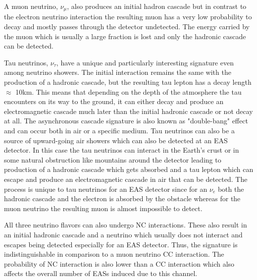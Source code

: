 A muon neutrino, $\nu_{\mu}$, also produces an initial hadron cascade but in contrast to the electron neutrino interaction the resulting muon has a very low probability to decay and mostly passes through the detector undetected. The energy carried by the muon which is usually a large fraction is lost and only the hadronic cascade can be detected.

Tau neutrinos, $\nu_{\tau}$, have a unique and particularly interesting signature even among neutrino showers. The initial interaction remains the same with the production of a hadronic cascade, but the resulting tau lepton has a decay length $\approx$ 10km. This means that depending on the depth of the atmosphere the tau encounters on its way to the ground, it can either decay and produce an electromagnetic cascade much later than the initial hadronic cascade or not decay at all. The asynchronous cascade signature is also known as "double-bang" effect and can occur both in air or a specific medium. Tau neutrinos can also be a source of upward-going air showers which can also be detected at an EAS detector. In this case the tau neutrinos can interact in the Earth's crust or in some natural obstruction like mountains around the detector leading to production of a hadronic cascade which gets absorbed and a tau lepton which can escape and produce an electromagnetic cascade in air that can be detected. The process is unique to tau neutrinos for an EAS detector since for an $\nu_e$ both the hadronic cascade and the electron is absorbed by the obstacle whereas for the muon neutrino the resulting muon is almost impossible to detect.  

All three neutrino flavors can also undergo NC interactions. These also result in an initial hadronic cascade and a neutrino which usually does not interact and escapes being detected especially for an EAS detector. Thus, the signature is indistinguishable in comparison to a muon neutrino CC interaction. The probability of NC interaction is also lower than a CC interaction which also affects the overall number of EASs induced due to this channel.


